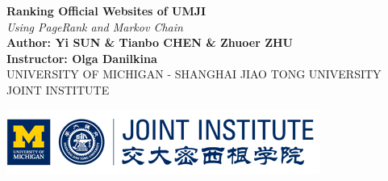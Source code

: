 \documentclass[a0,portrait]{a0poster}
\begin{document}


\begin{minipage}[H]{0.7\linewidth}
\veryHuge \color{NavyBlue} \textbf{Ranking Official Websites of UMJI} \color{Black}\\ %
\Huge\textit{Using PageRank and Markov Chain}\\[2cm] %
\huge \textbf{Author: Yi SUN \& Tianbo CHEN \& Zhuoer ZHU}\\
\huge \textbf{Instructor: Olga Danilkina}\\[0.5cm] %
\Large UNIVERSITY OF MICHIGAN - SHANGHAI JIAO TONG UNIVERSITY JOINT INSTITUTE\\[0.4cm] %
\end{minipage}
%
\begin{minipage}[l]{0.3\linewidth}
\includegraphics[width=\linewidth]{JI_logo}\\
\end{minipage}

\vspace{1cm} %

\end{document}
